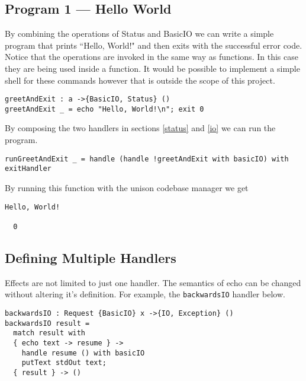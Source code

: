 \documentclass[logo,bsc,singlespacing,parskip]{infthesis}
\begin{document}
\begin{tcolorbox}[colback=gray!10, colframe=black, arc=0pt, outer arc=0pt]

\section*{Program 1 --- Hello World}
\label{prog:helloworld}

By combining the operations of Status and BasicIO we can write a simple program that prints ``Hello, World!" and then exits with the successful error code. Notice that the operations are invoked in the same way as functions. In this case they are being used inside a function. It would be possible to implement a simple shell for these commands however that is outside the scope of this project.

\begin{lstlisting}[language=unison]
greetAndExit : a ->{BasicIO, Status} ()
greetAndExit _ = echo "Hello, World!\n"; exit 0
\end{lstlisting}

By composing the two handlers in sections \ref{status} and \ref{io} we can run the program.

\begin{lstlisting}[language=unison]
runGreetAndExit _ = handle (handle !greetAndExit with basicIO) with exitHandler
\end{lstlisting}

By running this function with the unison codebase manager we get

\begin{lstlisting}[style=terminal]
Hello, World!

  0
\end{lstlisting}
\end{tcolorbox}

\subsection{Defining Multiple Handlers}

Effects are not limited to just one handler. The semantics of echo can be
changed without altering it's definition. For example, the \texttt{backwardsIO}
handler below.

\begin{lstlisting}[language=unison]
backwardsIO : Request {BasicIO} x ->{IO, Exception} () 
backwardsIO result =
  match result with
  { echo text -> resume } -> 
    handle resume () with basicIO 
    putText stdOut text;
  { result } -> ()
\end{lstlisting}
\end{document}
